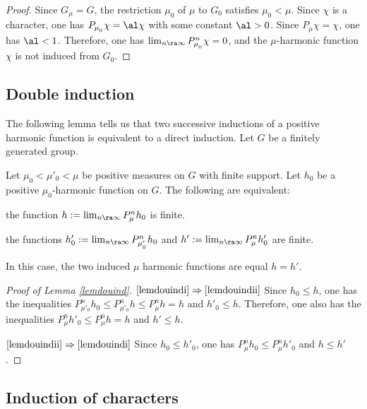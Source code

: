 \begin{proof}
Since $G_\mu=G$, the restriction $\mu_0$ of $\mu$ to $G_0$ satisfies $\mu_0<\mu$. Since $\chi$ is a character, one has $P_{\mu_{_0}}\chi =\al \chi$ with some constant $\al>0$.
Since $P_\mu\chi=\chi$, one has $\al<1$.
Therefore, one has $\lim_{n\ra\infty}P^n_{\mu_{_0}}\chi=0$, and
the $\mu$-harmonic function $\chi$ is not induced
from $G_0$.
\end{proof}

\subsection{Double induction}
\label{secdouind}

\bq
The following lemma
tells us that two successive inductions
of a positive harmonic function is equivalent to a direct induction.
\eq
Let $G$ be a finitely generated group.

\begin{Lem}
\label{lemdouind}
Let
$\mu_0<\mu'_0<\mu$ be positive measures on $G$ with finite support.
Let $h_0$ be a positive $\mu_0$-harmonic function on $G$.
The following are equivalent:
\begin{enumeratei}
\item\label{lemdouindi}
the function
$h:=\lim_{n\ra\infty}P^n_{\mu}h_0$ is finite.
\item\label{lemdouindii}
the functions
$h'_0:=\lim_{n\ra\infty}P^n_{\mu'_{_0}}h_0$ and
$h':=\lim_{n\ra\infty}P^n_{\mu}h'_0$ are finite.
\end{enumeratei}
\noindent
In this case, the two induced $\mu$ harmonic functions are equal $h=h'$.
\end{Lem}

\skpt
\begin{proof}[Proof of Lemma \ref{lemdouind}]
$\eqref{lemdouindi}\Rightarrow\eqref{lemdouindii}$
Since $h_0\leq h$, one has the inequalities
$P^n_{\mu'_0}h_0\leq P^n_{\mu'_0}h\leq P^n_{\mu}h= h$ and $h'_0\leq h$.
Therefore, one also has the inequalities $P^n_{\mu}h'_0\leq P^n_{\mu}h= h$ and $h'\leq h$.

$\eqref{lemdouindii} \Rightarrow\eqref{lemdouindi}$
Since $h_0\leq h'_0$, one has $P^n_{\mu}h_0\leq P^n_{\mu}h'_0$ and $h\leq h'$.
\end{proof}

\subsection{Induction of characters}
\label{secindcha}

